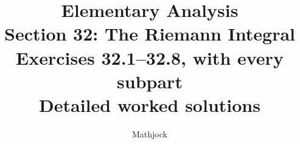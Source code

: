 
\title{\textbf{Elementary Analysis}\\[0.3em]
Section 32: The Riemann Integral\\[0.4em]
\large Exercises 32.1--32.8, with every subpart\\
Detailed worked solutions}
\author{Mathjock}
\date{}

\maketitle
\bookinfo
\tableofcontents
\clearpage
\setcounter{section}{31}


